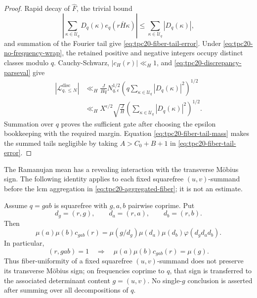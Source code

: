 \begin{proof}
Rapid decay of \(\widehat F\), the trivial bound
\[
 \left|\sum_{\kappa\in\mathcal U_q}
 D_q(\kappa)e_q(r\overline H\kappa)\right|
 \le\sum_{\kappa\in\mathcal U_q}|D_q(\kappa)|,
\]
and summation of the Fourier tail give
\eqref{eq:tpc20-fiber-tail-error}.  Under
\eqref{eq:tpc20-no-frequency-wrap}, the retained positive and negative
integers occupy distinct classes modulo \(q\).  Cauchy-Schwarz,
\(|c_H(r)|\ll_H1\), and
\eqref{eq:tpc20-discrepancy-parseval} give
\begin{align*}
 |\mathcal L_{q,\le N}^{\mathrm{disc}}|
 &\ll_H\frac{J}{Hq}N_{q,\epsilon}^{1/2}
 \left(q\sum_{\kappa\in\mathcal U_q}|D_q(\kappa)|^2\right)^{1/2}\\
 &\ll_H X^{\epsilon/2}\sqrt{\frac JH}
 \left(\sum_{\kappa\in\mathcal U_q}|D_q(\kappa)|^2\right)^{1/2}.
\end{align*}
Summation over \(q\) proves the sufficient gate after choosing the
epsilon bookkeeping with the required margin.  Equation
\eqref{eq:tpc20-fiber-tail-mass} makes the summed tails negligible by
taking \(A>C_0+B+1\) in \eqref{eq:tpc20-fiber-tail-error}.
\end{proof}

The Ramanujan mean has a revealing interaction with the transverse
M\"obius sign.  The following identity applies to each fixed
squarefree \((u,v)\)-summand before the lcm aggregation in
\eqref{eq:tpc20-aggregated-fiber}; it is not an estimate.

\begin{proposition}
\label{prop:tpc20-sign-migration}
Assume \(q=gab\) is squarefree with \(g,a,b\) pairwise coprime.  Put
\begin{equation}
 d_g=(r,g),\qquad d_a=(r,a),\qquad d_b=(r,b).
 \label{eq:tpc20-frequency-contents}
\end{equation}
Then
\begin{equation}
 \boxed{
 \mu(a)\mu(b)c_{gab}(r)
 =\mu(g/d_g)\mu(d_a)\mu(d_b)
  \varphi(d_gd_ad_b).}
 \label{eq:tpc20-sign-migration}
\end{equation}
In particular,
\begin{equation}
 (r,gab)=1
 \quad\Longrightarrow\quad
 \mu(a)\mu(b)c_{gab}(r)=\mu(g).
 \label{eq:tpc20-coprime-sign-migration}
\end{equation}
Thus fiber-uniformity of a fixed squarefree \((u,v)\)-summand does not
preserve its transverse M\"obius sign; on frequencies coprime to \(q\),
that sign is transferred to the associated determinant content
\(g=(u,v)\).  No single-\(g\) conclusion is asserted after summing over
all decompositions of \(q\).
\end{proposition}

